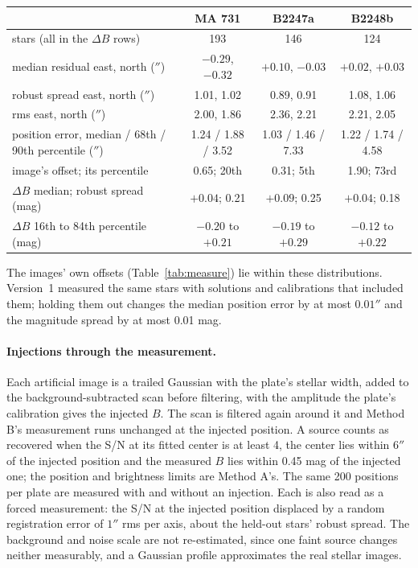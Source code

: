 \documentclass[11pt]{article}
\begin{document}
\begin{appendices}
\begin{center}
\footnotesize
\begin{tabular}{@{}lccc@{}}
\toprule
 & MA 731 & B2247a & B2248b \\
\midrule
stars (all in the $\Delta B$ rows) & 193 & 146 & 124 \\
median residual east, north ($''$) & $-0.29$, $-0.32$ & $+0.10$, $-0.03$ & $+0.02$, $+0.03$ \\
robust spread east, north ($''$) & 1.01, 1.02 & 0.89, 0.91 & 1.08, 1.06 \\
rms east, north ($''$) & 2.00, 1.86 & 2.36, 2.21 & 2.21, 2.05 \\
position error, median / 68th / 90th percentile ($''$) & 1.24 / 1.88 / 3.52 & 1.03 / 1.46 / 7.33 & 1.22 / 1.74 / 4.58 \\
image's offset; its percentile & 0.65; 20th & 0.31; 5th & 1.90; 73rd \\
$\Delta B$ median; robust spread (mag) & $+0.04$; 0.21 & $+0.09$; 0.25 & $+0.04$; 0.18 \\
$\Delta B$ 16th to 84th percentile (mag) & $-0.20$ to $+0.21$ & $-0.19$ to $+0.29$ & $-0.12$ to $+0.22$ \\
\bottomrule
\end{tabular}
\end{center}
The images' own offsets (Table~\ref{tab:measure}) lie within these distributions. Version~1 measured the same stars with solutions and calibrations that included them; holding them out changes the median position error by at most $0.01''$ and the magnitude spread by at most 0.01 mag.

\paragraph{Injections through the measurement.} Each artificial image is a trailed Gaussian with the plate's stellar width, added to the background-subtracted scan before filtering, with the amplitude the plate's calibration gives the injected $B$. The scan is filtered again around it and Method B's measurement runs unchanged at the injected position. A source counts as recovered when the S/N at its fitted center is at least 4, the center lies within $6''$ of the injected position and the measured $B$ lies within 0.45 mag of the injected one; the position and brightness limits are Method A's. The same 200 positions per plate are measured with and without an injection. Each is also read as a forced measurement: the S/N at the injected position displaced by a random registration error of $1''$ rms per axis, about the held-out stars' robust spread. The background and noise scale are not re-estimated, since one faint source changes neither measurably, and a Gaussian profile approximates the real stellar images.


\end{appendices}
\end{document}
